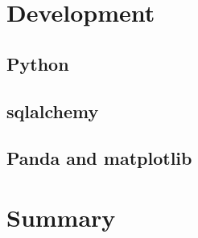 \documentclass[../Main/thesis.tex]{subfiles}
\begin{document}
\section{Development}\label{sec:development} 
    \subsection*{Python}
    \subsection*{sqlalchemy}
    \subsection*{Panda and matplotlib}

\section*{Summary}\label{sec:summary-theory} 

\blankpage
\end{document}
